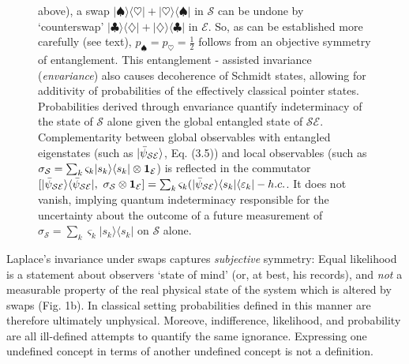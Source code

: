 \documentclass[aps,rmp,floatfix,11pt]{revtex4}
\newcommand{\bra}[1]    {\langle #1|}
\newcommand{\ket}[1]    {| #1 \rangle}
\newcommand{\cS}        {{\mathcal S}}
\newcommand{\cE}        {{\mathcal E}}
\newcommand{\+}         {\dagger}
\begin{document}
\begin{figure}[p]
{above), a swap $\ket \spadesuit \bra \heartsuit + \ket \heartsuit \bra \spadesuit$ in $\cS$ can be undone by `counterswap' $\ket \clubsuit \bra \diamondsuit + \ket \diamondsuit \bra \clubsuit$ in $\cE$. So, 
as can be established more carefully (see text),  $p_\spadesuit = p_\heartsuit=\frac 1 2$ follows from 
an objective symmetry of entanglement. This entanglement - assisted invariance ({\it envariance}) 
also causes decoherence of Schmidt states, allowing for additivity of probabilities of the effectively classical pointer states. Probabilities derived through envariance quantify indeterminacy of the state of 
$\cS$ alone given the global entangled state of $\cS\cE$. Complementarity between 
global observables with entangled eigenstates (such as $\ket {\bar \psi_{\cal SE}}$, Eq. (3.5)) and 
local observables (such as $\sigma_{\cS} = \sum_k \varsigma_k |s_k \rangle \langle s_k|\otimes {\bf 1}_{\cE}$) is reflected in the commutator $[\ket {\bar \psi_{\cal SE}}\bra {\bar \psi_{\cal SE}}, ~\sigma_{\cS} \otimes {\bf 1}_{\cE}]=\sum_k \varsigma_k (\ket {\bar \psi_{\cal SE}}\bra {s_k } \bra {\varepsilon_k} - h.c.$. 
It does not vanish, implying quantum indeterminacy responsible for the uncertainty about the outcome 
of a future measurement of $\sigma_{\cS} = \sum_k \varsigma_k |s_k\rangle \langle s_k|$ on $\cS$ alone.}
\label{cards}
\end{figure}

Laplace's invariance under swaps captures {\it subjective} symmetry: Equal likelihood is a statement 
about observers `state of mind'  (or, at best, his records), and {\it not} a measurable property of the real 
physical state of the system which is altered by swaps (Fig. 1b). In classical setting probabilities defined 
in this manner are therefore ultimately unphysical. Moreove, indifference, likelihood, and probability are all ill-defined attempts to quantify the same ignorance. Expressing one undefined concept in terms of another undefined concept is not a definition.
\end{document}
